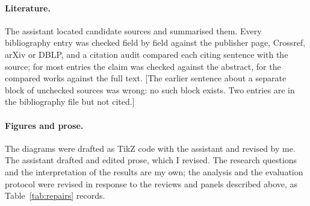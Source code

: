 \paragraph{Literature.} The assistant located candidate sources and summarised them. Every bibliography
entry was checked field by field against the publisher page, Crossref, arXiv or DBLP, and a citation
audit compared each citing sentence with the source; for most entries the claim was checked against the
abstract, for the compared works against the full text. [The earlier sentence about a separate block of
unchecked sources was wrong: no such block exists. Two entries are in the bibliography file but not
cited.]

\paragraph{Figures and prose.} The diagrams were drafted as TikZ code with the assistant and revised by
me. The assistant drafted and edited prose, which I revised. The research questions and the
interpretation of the results are my own; the analysis and the evaluation protocol were revised in
response to the reviews and panels described above, as Table~\ref{tab:repairs} records.
